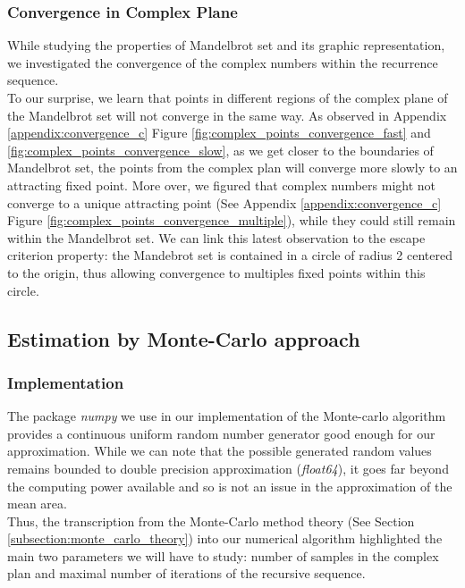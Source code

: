 \documentclass{article}
\begin{document}
    \subsubsection*{Convergence in Complex Plane}

    While studying the properties of Mandelbrot set and its graphic representation, we investigated the convergence of the complex numbers within the recurrence sequence.\\ To our surprise, we learn that points in different regions of the complex plane of the Mandelbrot set will not converge in the same way. As observed in Appendix \ref{appendix:convergence_c} Figure \ref{fig:complex_points_convergence_fast} and \ref{fig:complex_points_convergence_slow}, as we get closer to the boundaries of Mandelbrot set, the points from the complex plan will converge more slowly to an attracting fixed point. More over, we figured that complex numbers might not converge to a unique attracting point (See Appendix \ref{appendix:convergence_c} Figure \ref{fig:complex_points_convergence_multiple}), while they could still remain within the Mandelbrot set. We can link this latest observation to the escape criterion property: the Mandebrot set is contained in a circle of radius 2 centered to the origin, thus allowing convergence to multiples fixed points within this circle.

    \subsection{Estimation by Monte-Carlo approach}
    \label{section:part_2_monte_carlo}

    \subsubsection*{Implementation}

    The package \emph{numpy} we use in our implementation of the Monte-carlo algorithm provides a continuous uniform random number generator good enough for our approximation. While we can note that the possible generated random values remains bounded to double precision approximation (\emph{float64}), it goes far beyond the computing power available and so is not an issue in the approximation of the mean area.\\
    Thus, the transcription from the Monte-Carlo method theory (See Section \ref{subsection:monte_carlo_theory}) into our numerical algorithm highlighted the main two parameters we will have to study: number of samples in the complex plan and maximal number of iterations of the recursive sequence.\\
\end{document}
